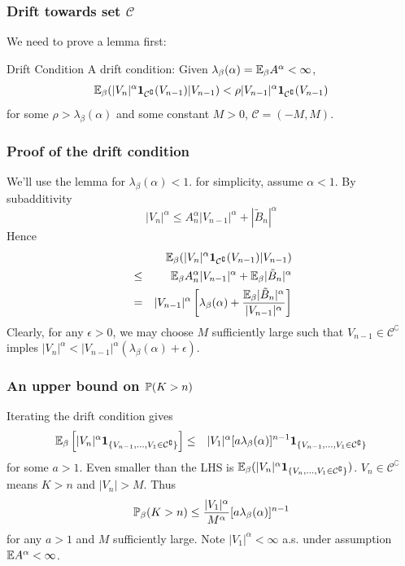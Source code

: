 \documentclass{beamer}
\begin{document}
\begin{frame}
  \frametitle{Drift towards set $\mathcal C$}
  We need to prove a lemma first:
  \begin{exampleblock}{Drift Condition}
    A drift condition: Given $\lambda_\beta(\alpha) = \E_\beta
    A^\alpha < \infty$,
    \[
    \E_\beta (|V_n|^\alpha \I{\mathcal C^\complement}(V_{n-1}) |
    V_{n-1}) < \rho |V_{n-1}|^\alpha\I{\mathcal C^\complement}(V_{n-1})
    \]
    for some $\rho > \lambda_\beta(\alpha)$ and some constant $M > 0$,
    $\mathcal C = (-M, M)$.
  \end{exampleblock}
\end{frame}

\begin{frame}
  \frametitle{Proof of the drift condition}
  We'll use the lemma for $\lambda_\beta(\alpha) < 1$. for
  simplicity, assume $\alpha < 1$. By subadditivity
  \[
  |V_n|^\alpha \leq A_n^\alpha |V_{n-1}|^\alpha + |\tilde B_n|^\alpha
  \]
  Hence
  \begin{eqnarray*}
    && \E_\beta (|V_n|^\alpha \I{\mathcal C^\complement}(V_{n-1})
    | V_{n-1}) \\
    &\leq& \E_\beta A_n^\alpha |V_{n-1}|^\alpha +
    \E_\beta |\tilde B_n|^\alpha \\
    &=& |V_{n-1}|^\alpha \left[
      \lambda_\beta(\alpha) + {
        \E_\beta |\tilde B_n|^\alpha
        \over
        |V_{n-1}|^\alpha
      }
    \right]
  \end{eqnarray*}
  Clearly, for any $\epsilon > 0$, we may choose $M$ sufficiently
  large such that $V_{n-1} \in \mathcal C^\complement$ imples
  $|V_n|^\alpha < |V_{n-1}|^\alpha (\lambda_\beta (\alpha) + \epsilon)$.
\end{frame}

\begin{frame}
  \frametitle{An upper bound on $\P(K > n)$}
  Iterating the drift condition gives
  \begin{eqnarray*}
    \E_\beta \left[
      |V_n|^\alpha
      \1{V_{n-1}, \dots, V_1 \in \mathcal C^\complement}
    \right]
    &\leq& |V_1|^\alpha [a \lambda_\beta(\alpha)]^{n-1}
    \1{V_{n-1}, \dots, V_1 \in \mathcal C^\complement}
  \end{eqnarray*}
  for some $a > 1$. Even smaller than the LHS is $\E_\beta (|V_n|^\alpha
  \1{V_n, \dots, V_1 \in \mathcal C^\complement})$. $V_n \in \mathcal
  C^\complement$ means $K > n$ and $|V_n| > M$. Thus
  \[
  \P_\beta(K > n) \leq {
    |V_1|^\alpha
    \over
    M^\alpha
  } [a \lambda_\beta(\alpha)]^{n-1}
  \]
  for any $a > 1$ and $M$ sufficiently large. Note $|V_1|^\alpha <
  \infty$ a.s. under assumption $\E A^\alpha < \infty$.
\end{frame}
\end{document}
